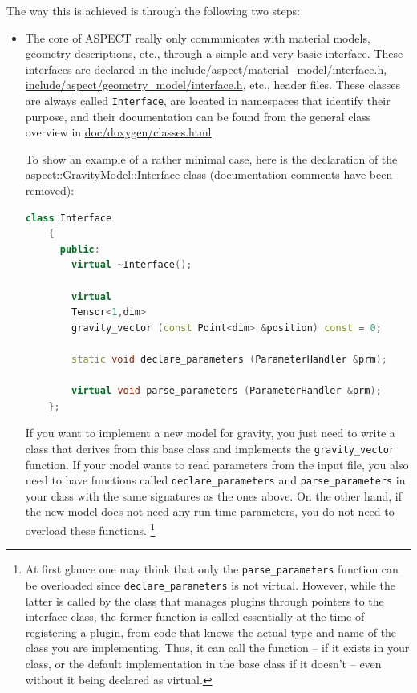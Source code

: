 \documentclass{article}
\newcommand{\aspect}{\textsc{ASPECT}}
\begin{document}
The way this is achieved is through the
following two steps:
\begin{itemize}
\item The core of \aspect{} really only communicates with material models,
  geometry descriptions, etc., through a simple and very basic
  interface. These interfaces are declared in the
  \url{include/aspect/material_model/interface.h},
  \url{include/aspect/geometry_model/interface.h}, etc., header files. These
  classes are always called \texttt{Interface}, are located in namespaces that
  identify their purpose, and their documentation can be found from the
  general class overview in \url{doc/doxygen/classes.html}.

  To show an example of a rather minimal case, here is the declaration of the
\href{doc/doxygen/classaspect_1_1GravityModel_1_1Interface.html}{aspect::GravityModel::Interface} class (documentation comments have
  been removed):
  \begin{lstlisting}[frame=single,language=C++]
    class Interface
    {
      public:
        virtual ~Interface();

        virtual
        Tensor<1,dim>
        gravity_vector (const Point<dim> &position) const = 0;

        static void declare_parameters (ParameterHandler &prm);

        virtual void parse_parameters (ParameterHandler &prm);
    };
  \end{lstlisting}

  If you want to implement a new model for gravity, you just need to write a
  class that derives from this base class and implements the
  \texttt{gravity\_vector} function. If your model wants to read parameters
  from the input file, you also need to have functions called
  \texttt{declare\_parameters} and \texttt{parse\_parameters} in your class
  with the same signatures as the ones above. On the other hand, if the new
  model does not need any run-time parameters, you do not need to overload
  these functions.%
  \footnote{At first glance one may think that only the
    \texttt{parse\_parameters} function can be overloaded since
    \texttt{declare\_parameters} is not virtual. However, while the latter is
    called by the class that manages plugins through pointers to the interface
    class, the former function is called essentially at the time of
    registering a plugin, from code that knows the actual type and name of the
    class you are implementing. Thus, it can call the function -- if it exists
    in your class, or the default implementation in the base class if it doesn't
    -- even without it being declared as virtual.}


\end{itemize}
\end{document}
